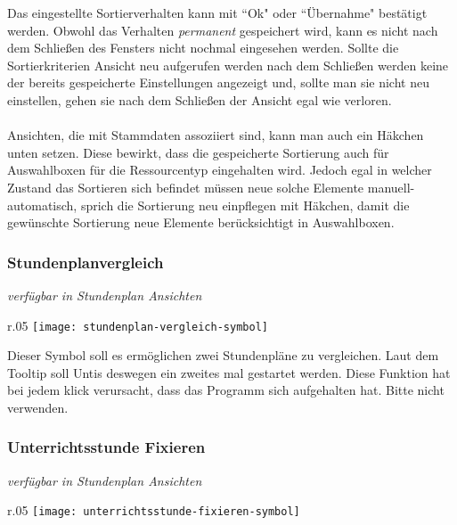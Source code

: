 \noindent
Das eingestellte Sortierverhalten kann mit ``Ok" oder ``Übernahme" bestätigt werden. Obwohl das Verhalten \textit{permanent} gespeichert wird, kann es nicht nach dem Schließen des Fensters nicht nochmal eingesehen werden. Sollte die Sortierkriterien Ansicht neu aufgerufen werden nach dem Schließen werden keine der bereits gespeicherte Einstellungen angezeigt und, sollte man sie nicht neu einstellen, gehen sie nach dem Schließen der Ansicht egal wie verloren.\\
\\
Ansichten, die mit Stammdaten assoziiert sind, kann man auch ein Häkchen unten setzen. Diese bewirkt, dass die gespeicherte Sortierung auch für Auswahlboxen für die Ressourcentyp eingehalten wird. Jedoch egal in welcher Zustand das Sortieren sich befindet müssen neue solche Elemente manuell-automatisch, sprich die Sortierung neu einpflegen mit Häkchen, damit die gewünschte Sortierung neue Elemente berücksichtigt in Auswahlboxen.\\

\subsubsection{Stundenplanvergleich}
{\small\textit{verfügbar in Stundenplan Ansichten\\}\par}

\begin{wrapfigure}{r}{.05\textwidth}
	\vspace{-50pt}
	\texttt{[image: stundenplan-vergleich-symbol]}
	\vspace{-35pt}
\end{wrapfigure}

\noindent
Dieser Symbol soll es ermöglichen zwei Stundenpläne zu vergleichen. Laut dem Tooltip soll Untis deswegen ein zweites mal gestartet werden. Diese Funktion hat bei jedem klick verursacht, dass das Programm sich aufgehalten hat. Bitte nicht verwenden.\\

\subsubsection{Unterrichtsstunde Fixieren}
{\small\textit{verfügbar in Stundenplan Ansichten\\}\par}

\begin{wrapfigure}{r}{.05\textwidth}
	\vspace{-50pt}
	\texttt{[image: unterrichtsstunde-fixieren-symbol]}
	\vspace{-35pt}
\end{wrapfigure}

